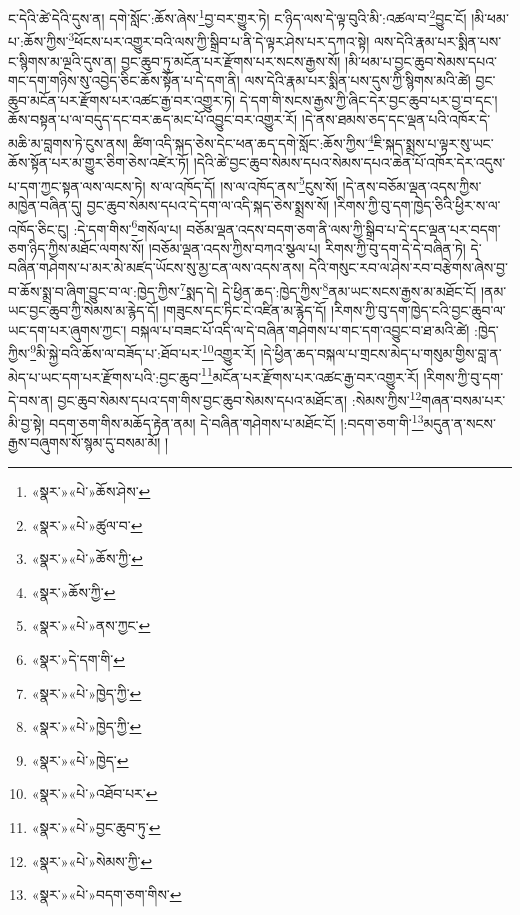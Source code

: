 ང་དེའི་ཚེ་དེའི་དུས་ན། དགེ་སློང་:ཆོས་ཞེས་\footnote{«སྣར་»«པེ་»ཆོས་ཤེས་}བྱ་བར་གྱུར་ཏེ། ང་ཉིད་ལས་དེ་ལྟ་བུའི་མི་:འཚལ་བ་\footnote{«སྣར་»«པེ་»ཚུལ་བ་}བྱུང་ངོ། །མི་ཕམ་པ་:ཆོས་ཀྱིས་\footnote{«སྣར་»«པེ་»ཆོས་ཀྱི་}ཕོངས་པར་འགྱུར་བའི་ལས་ཀྱི་སྒྲིབ་པ་ནི་དེ་ལྟར་ཤེས་པར་དཀའ་སྟེ། ལས་དེའི་རྣམ་པར་སྨིན་པས་ང་སྙིགས་མ་ལྔའི་དུས་ན། བྱང་ཆུབ་ཏུ་མངོན་པར་རྫོགས་པར་སངས་རྒྱས་སོ། །མི་ཕམ་པ་བྱང་ཆུབ་སེམས་དཔའ་གང་དག་གཉིས་སུ་འབྱེད་ཅིང་ཆོས་སྟོན་པ་དེ་དག་ནི། ལས་དེའི་རྣམ་པར་སྨིན་པས་དུས་ཀྱི་སྙིགས་མའི་ཚེ། བྱང་ཆུབ་མངོན་པར་རྫོགས་པར་འཚང་རྒྱ་བར་འགྱུར་ཏེ། དེ་དག་གི་སངས་རྒྱས་ཀྱི་ཞིང་དེར་བྱང་ཆུབ་པར་བྱ་བ་དང་། ཆོས་བསྟན་པ་ལ་བདུད་དང་བར་ཆད་མང་པོ་འབྱུང་བར་འགྱུར་རོ། །དེ་ནས་ཐམས་ཅད་དང་ལྡན་པའི་འཁོར་དེ་མཆི་མ་བླགས་ཏེ་ངུས་ནས། ཚིག་འདི་སྐད་ཅེས་དེང་ཕན་ཆད་དགེ་སློང་:ཆོས་ཀྱིས་\footnote{«སྣར་»ཆོས་ཀྱི་}ཇི་སྐད་སྨྲས་པ་ལྟར་སུ་ཡང་ཆོས་སྟོན་པར་མ་གྱུར་ཅིག་ཅེས་འཛེར་ཏོ། །དེའི་ཚེ་བྱང་ཆུབ་སེམས་དཔའ་སེམས་དཔའ་ཆེན་པོ་འཁོར་དེར་འདུས་པ་དག་ཀྱང་སྟན་ལས་ལངས་ཏེ། ས་ལ་འཁོད་དོ། །ས་ལ་འཁོད་ནས་\footnote{«སྣར་»«པེ་»ནས་ཀྱང་}ངུས་སོ། །དེ་ནས་བཅོམ་ལྡན་འདས་ཀྱིས་མཁྱེན་བཞིན་དུ། བྱང་ཆུབ་སེམས་དཔའ་དེ་དག་ལ་འདི་སྐད་ཅེས་སྨྲས་སོ། །རིགས་ཀྱི་བུ་དག་ཁྱེད་ཅིའི་ཕྱིར་ས་ལ་འཁོད་ཅིང་ངུ། :དེ་དག་གིས་\footnote{«སྣར་»དེ་དག་གི་}གསོལ་པ། བཅོམ་ལྡན་འདས་བདག་ཅག་ནི་ལས་ཀྱི་སྒྲིབ་པ་དེ་དང་ལྡན་པར་བདག་ཅག་ཉིད་ཀྱིས་མཐོང་ལགས་སོ། །བཅོམ་ལྡན་འདས་ཀྱིས་བཀའ་སྩལ་པ། རིགས་ཀྱི་བུ་དག་དེ་དེ་བཞིན་ཏེ། དེ་བཞིན་གཤེགས་པ་མར་མེ་མཛད་ཡོངས་སུ་མྱ་ངན་ལས་འདས་ནས། དེའི་གསུང་རབ་ལ་ཤེས་རབ་བརྩེགས་ཞེས་བྱ་བ་ཆོས་སྨྲ་བ་ཞིག་བྱུང་བ་ལ་:ཁྱེད་ཀྱིས་\footnote{«སྣར་»«པེ་»ཁྱེད་ཀྱི་}སྨད་དེ། དེ་ཕྱིན་ཆད་:ཁྱེད་ཀྱིས་\footnote{«སྣར་»«པེ་»ཁྱེད་ཀྱི་}ནམ་ཡང་སངས་རྒྱས་མ་མཐོང་ངོ། །ནམ་ཡང་བྱང་ཆུབ་ཀྱི་སེམས་མ་རྙེད་དོ། །གཟུངས་དང་ཏིང་ངེ་འཛིན་མ་རྙེད་དོ། །རིགས་ཀྱི་བུ་དག་ཁྱེད་ངའི་བྱང་ཆུབ་ལ་ཡང་དག་པར་ཞུགས་ཀྱང་། བསྐལ་པ་བཟང་པོ་འདི་ལ་དེ་བཞིན་གཤེགས་པ་གང་དག་འབྱུང་བ་ཐ་མའི་ཚེ། :ཁྱེད་ཀྱིས་\footnote{«སྣར་»«པེ་»ཁྱེད་}མི་སྐྱེ་བའི་ཆོས་ལ་བཟོད་པ་:ཐོབ་པར་\footnote{«སྣར་»«པེ་»འཐོབ་པར་}འགྱུར་རོ། །དེ་ཕྱིན་ཆད་བསྐལ་པ་གྲངས་མེད་པ་གསུམ་གྱིས་བླ་ན་མེད་པ་ཡང་དག་པར་རྫོགས་པའི་:བྱང་ཆུབ་\footnote{«སྣར་»«པེ་»བྱང་ཆུབ་ཏུ་}མངོན་པར་རྫོགས་པར་འཚང་རྒྱ་བར་འགྱུར་རོ། །རིགས་ཀྱི་བུ་དག་དེ་བས་ན། བྱང་ཆུབ་སེམས་དཔའ་དག་གིས་བྱང་ཆུབ་སེམས་དཔའ་མཐོང་ན། :སེམས་ཀྱིས་\footnote{«སྣར་»«པེ་»སེམས་ཀྱི་}གཞན་བསམ་པར་མི་བྱ་སྟེ། བདག་ཅག་གིས་མཆོད་རྟེན་ནམ། དེ་བཞིན་གཤེགས་པ་མཐོང་ངོ། །:བདག་ཅག་གི་\footnote{«སྣར་»«པེ་»བདག་ཅག་གིས་}མདུན་ན་སངས་རྒྱས་བཞུགས་སོ་སྙམ་དུ་བསམ་མོ། །
